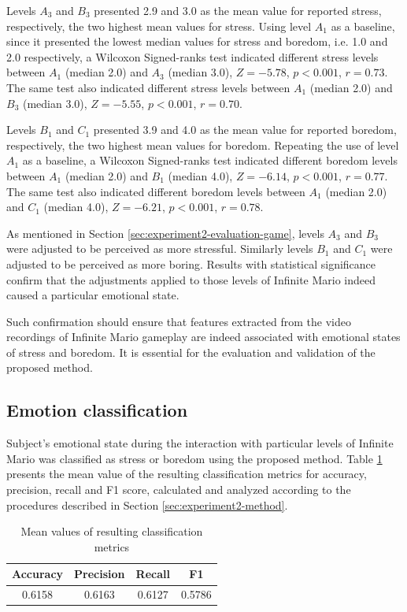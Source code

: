 Levels $A_3$ and $B_3$ presented 2.9 and 3.0 as the mean value for reported stress, respectively, the two highest mean values for stress. Using level $A_1$ as a baseline, since it presented the lowest median values for stress and boredom, i.e. 1.0 and 2.0 respectively, a Wilcoxon Signed-ranks test indicated different stress levels between $A_1$ (median 2.0) and $A_3$ (median 3.0), $Z=-5.78$, $p < 0.001$, $r=0.73$. The same test also indicated different stress levels between $A_1$ (median 2.0) and $B_3$ (median 3.0), $Z=-5.55$, $p < 0.001$, $r=0.70$.

Levels $B_1$ and $C_1$ presented 3.9 and 4.0 as the mean value for reported boredom, respectively, the two highest mean values for boredom. Repeating the use of level $A_1$ as a baseline, a Wilcoxon Signed-ranks test indicated different boredom levels between $A_1$ (median 2.0) and $B_1$ (median 4.0), $Z=-6.14$, $p < 0.001$, $r=0.77$. The same test also indicated different boredom levels between $A_1$ (median 2.0) and $C_1$ (median 4.0), $Z=-6.21$, $p < 0.001$, $r=0.78$.

As mentioned in Section \ref{sec:experiment2-evaluation-game}, levels $A_3$ and $B_3$ were adjusted to be perceived as more stressful. Similarly levels $B_1$ and $C_1$ were adjusted to be perceived as more boring. Results with statistical significance confirm that the adjustments applied to those levels of Infinite Mario indeed caused a particular emotional state.

Such confirmation should ensure that features extracted from the video recordings of Infinite Mario gameplay are indeed associated with emotional states of stress and boredom. It is essential for the evaluation and validation of the proposed method.

\subsection{Emotion classification}

Subject's emotional state during the interaction with particular levels of Infinite Mario was classified as stress or boredom using the proposed method. Table \ref{table:experiment2-result-metrics-mean} presents the mean value of the resulting classification metrics for accuracy, precision, recall and F1 score, calculated and analyzed according to the procedures described in Section \ref{sec:experiment2-method}.

\begin{table}[ht]
    \centering
    \caption{Mean values of resulting classification metrics}
    \label{table:experiment2-result-metrics-mean}
    \begin{tabular}[l]{@{}cccc}
        \toprule%
            \textbf{Accuracy} & \textbf{Precision} & \textbf{Recall} & \textbf{F1}\\
        \midrule%
            0.6158 & 0.6163 & 0.6127 & 0.5786 \\ %
        \bottomrule%
    \end{tabular}
\end{table}

